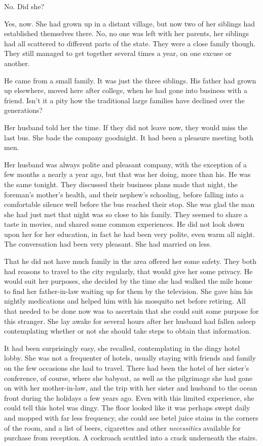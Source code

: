 \documentclass{article}
\begin{document}
No. Did she? 

Yes, now. She had grown up in a distant village, but now two of her siblings had established themselves there. No, no one was left with her parents, her siblings had all scattered to different parts of the state. They were a close family though. They still managed to get together several times a year, on one excuse or another. 

He came from a small family. It was just the three siblings. His father had grown up elsewhere, moved here after college, when he had gone into business with a friend. Isn't it a pity how the traditional large families have declined over the generations?

Her husband told her the time. If they did not leave now, they would miss the last bus. She bade the company goodnight. It had been a pleasure meeting both men. 

Her husband was always polite and pleasant company, with the exception of a few months a nearly a year ago, but that was her doing, more than his. He was the same tonight. They discussed their business plans made that night, the foreman's mother's health, and their nephew's schooling, before falling into a comfortable silence well before the bus reached their stop. She was glad the man she had just met that night was so close to his family. They seemed to share a taste in movies, and shared some common experiences. He did not look down upon her for her education, in fact he had been very polite, even warm all night. The conversation had been very pleasant. She had married on less. 

That he did not have much family in the area offered her some safety. They both had reasons to travel to the city regularly, that would give her some privacy. He would suit her purposes, she decided by the time she had walked the mile home to find her father-in-law waiting up for them by the television. She gave him his nightly medications and helped him with his mosquito net before retiring. All that needed to be done now was to ascertain that she could suit some purpose for this stranger. She lay awake for several hours after her husband had fallen asleep contemplating whether or not she should take steps to obtain that information.

It had been surprisingly easy, she recalled, contemplating in the dingy hotel lobby. She was not a frequenter of hotels, usually staying with friends and family on the few occasions she had to travel. There had been the hotel of her sister's conference, of course, where she babysat, as well as the pilgrimage she had gone on with her mother-in-law, and the trip with her sister and husband to the ocean front during the holidays a few years ago. Even with this limited experience, she could tell this hotel was dingy. The floor looked like it was perhaps swept daily and mopped with far less frequency, she could see betel juice stains in the corners of the room, and a list of beers, cigarettes and other \emph{necessities} available for purchase from reception. A cockroach scuttled into a crack underneath the stairs. 
\end{document}
